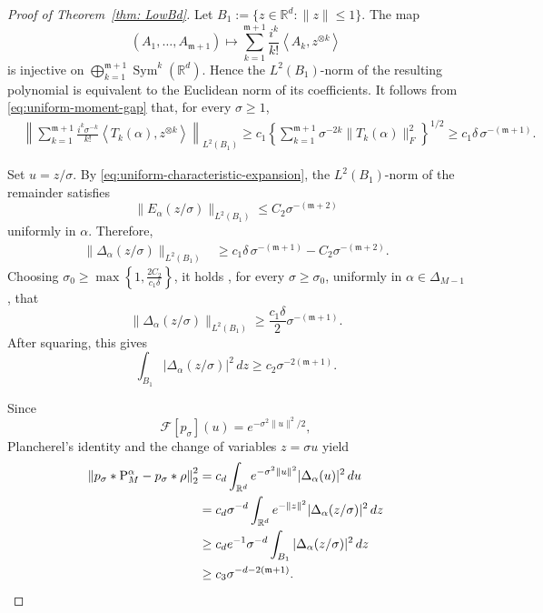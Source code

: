 \documentclass[10pt,a4paper]{amsart}
\begin{document}
\begin{proof}[Proof of Theorem~\ref{thm: LowBd}]
Let $B_1:=\{z\in\mathbb R^d:\|z\|\leq1\}$. The map
\[
  (A_1,\ldots,A_{\mathfrak{m}+1})
  \longmapsto
  \sum_{k=1}^{\mathfrak{m}+1}
  \frac{i^k}{k!}
  \left\langle A_k,z^{\otimes k}\right\rangle
\]
is injective on
\(
  \bigoplus_{k=1}^{\mathfrak{m}+1}
  \operatorname{Sym}^k(\mathbb{R}^d).
\)
Hence the \(L^2(B_1)\)-norm of the resulting polynomial is equivalent
to the Euclidean norm of its coefficients. It follows from
\eqref{eq:uniform-moment-gap} that, for every \(\sigma\geq 1\),
\begin{align}
  &\left\|
    \sum_{k=1}^{\mathfrak{m}+1}
    \frac{i^k\sigma^{-k}}{k!}
    \left\langle T_k(\alpha),z^{\otimes k}\right\rangle
  \right\|_{L^2(B_1)}
\geq
  c_1
  \left\{
    \sum_{k=1}^{\mathfrak{m}+1}
    \sigma^{-2k}\|T_k(\alpha)\|_F^2
  \right\}^{1/2}
  \geq
  c_1\delta\,
  \sigma^{-(\mathfrak{m}+1)}.
  \label{eq:polynomial-norm-lower-bound}
\end{align}

Set \(u=z/\sigma\). By
\eqref{eq:uniform-characteristic-expansion}, the \(L^2(B_1)\)-norm of
the remainder satisfies
\[
  \bigl\|E_\alpha(z/\sigma)\bigr\|_{L^2(B_1)}
  \leq
  C_2\sigma^{-(\mathfrak{m}+2)}
\]
uniformly in \(\alpha\). Therefore,
\begin{align*}
  \bigl\|\Delta_\alpha(z/\sigma)\bigr\|_{L^2(B_1)}
  &\geq
  c_1\delta\,\sigma^{-(\mathfrak{m}+1)}
  -
  C_2\sigma^{-(\mathfrak{m}+2)}.
\end{align*}
Choosing
\(
  \sigma_0
  \geq
  \max\left\{
    1,\frac{2C_2}{c_1\delta}
  \right\}\), it holds , for every \(\sigma\geq\sigma_0\), uniformly in
\(\alpha\in\Delta_{M-1}\), that
\[
  \bigl\|\Delta_\alpha(z/\sigma)\bigr\|_{L^2(B_1)}
  \geq
  \frac{c_1\delta}{2}
  \sigma^{-(\mathfrak{m}+1)}.
\]
After squaring, this gives
\begin{equation}
  \int_{B_1}
  \left|\Delta_\alpha(z/\sigma)\right|^2\,dz
  \geq
  c_2\sigma^{-2(\mathfrak{m}+1)}.
  \label{eq:characteristic-lower-bound}
\end{equation}

Since
\[
  \mathcal{F}[p_\sigma](u)
  =
  e^{-\sigma^2\|u\|^2/2},
\]
Plancherel's identity and the change of variables \(z=\sigma u\)
yield
\begin{align}
  \left\|
    p_\sigma*\mathrm{P}_M^\alpha-p_\sigma*\rho
  \right\|_2^2
  &=
  c_d
  \int_{\mathbb{R}^d}
  e^{-\sigma^2\|u\|^2}
  |\Delta_\alpha(u)|^2\,du
  \notag\\
  &=
  c_d\sigma^{-d}
  \int_{\mathbb{R}^d}
  e^{-\|z\|^2}
  |\Delta_\alpha(z/\sigma)|^2\,dz
  \notag\\
  &\geq
  c_de^{-1}\sigma^{-d}
  \int_{B_1}
  |\Delta_\alpha(z/\sigma)|^2\,dz
  \notag\\
  &\geq
  c_3
  \sigma^{-d-2(\mathfrak{m}+1)}.
  \label{eq:smoothed-l2-lower-bound}
\end{align}



\end{proof}
\end{document}
